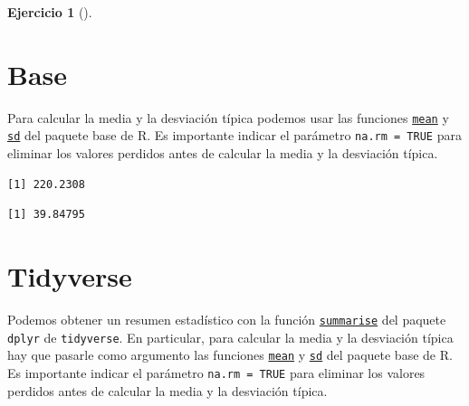 \documentclass[
  a4paper,
]{scrreport}
\newenvironment{Shaded}{\begin{snugshade}}{\end{snugshade}}
\newcommand{\AttributeTok}[1]{\textcolor[rgb]{0.40,0.45,0.13}{#1}}
\newcommand{\CommentTok}[1]{\textcolor[rgb]{0.37,0.37,0.37}{#1}}
\newcommand{\ConstantTok}[1]{\textcolor[rgb]{0.56,0.35,0.01}{#1}}
\newcommand{\FunctionTok}[1]{\textcolor[rgb]{0.28,0.35,0.67}{#1}}
\newcommand{\NormalTok}[1]{\textcolor[rgb]{0.00,0.23,0.31}{#1}}
\newcommand{\SpecialCharTok}[1]{\textcolor[rgb]{0.37,0.37,0.37}{#1}}
\theoremstyle{definition}
\newtheorem{exercise}{Ejercicio}[chapter]
\theoremstyle{remark}
\begin{document}
\begin{exercise}[]
\begin{enumerate}
\begin{tcolorbox}
  \section{Base}

  Para calcular la media y la desviación típica podemos usar las
  funciones
  \href{https://www.rdocumentation.org/packages/base/versions/3.6.2/topics/mean}{\texttt{mean}}
  y
  \href{https://www.rdocumentation.org/packages/stats/versions/3.6.2/topics/sd}{\texttt{sd}}
  del paquete base de R. Es importante indicar el parámetro
  \texttt{na.rm\ =\ TRUE} para eliminar los valores perdidos antes de
  calcular la media y la desviación típica.

\begin{Shaded}
\end{Shaded}

\begin{verbatim}
[1] 220.2308
\end{verbatim}

\begin{Shaded}
\end{Shaded}

\begin{verbatim}
[1] 39.84795
\end{verbatim}

  \section{Tidyverse}

  Podemos obtener un resumen estadístico con la función
  \href{https://dplyr.tidyverse.org/reference/summarise.html}{\texttt{summarise}}
  del paquete \texttt{dplyr} de \texttt{tidyverse}. En particular, para
  calcular la media y la desviación típica hay que pasarle como
  argumento las funciones
  \href{https://www.rdocumentation.org/packages/base/versions/3.6.2/topics/mean}{\texttt{mean}}
  y
  \href{https://www.rdocumentation.org/packages/stats/versions/3.6.2/topics/sd}{\texttt{sd}}
  del paquete base de R. Es importante indicar el parámetro
  \texttt{na.rm\ =\ TRUE} para eliminar los valores perdidos antes de
  calcular la media y la desviación típica.


\end{tcolorbox}
\end{enumerate}
\end{exercise}
\end{document}
